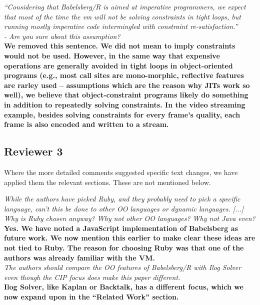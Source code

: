 \documentclass[english]{article}
\begin{document}
\textit{``Considering that Babelsberg/R is aimed at imperative
  programmers, we expect that most of the time the vm will not be
  solving constraints in tight loops, but running mostly imperative
  code intermingled with
  constraint re-satisfaction.''\\
  - Are you sure about this assumption?}\\
\textbf{We removed this sentence. We did not mean to imply constraints
  would not be used. However, in the same way that expensive
  operations are generally avoided in tight loops in object-oriented
  programs (e.g., most call sites are mono-morphic, reflective
  features are rarley used -- assumptions which are the reason why
  JITs work so well), we believe that object-constraint programs
  likely do something in addition to repeatedly solving
  constraints. In the video streaming example, besides solving
  constraints for every frame's quality, each frame is also encoded
  and written to a
  stream.}\\

\subsection*{Reviewer 3}

Where the more detailed comments suggested specific text changes, we
have applied them the relevant sections. These are not mentioned below.


\textit{While the authors have picked Ruby, and they probably need to
  pick a specific language, can't this be done to other OO languages
  or dynamic languages. [...] Why is Ruby chosen
  anyway? Why not other OO languages? Why not Java even?}\\
\textbf{Yes. We have noted a JavaScript implementation of
  Babelsberg as future work. We now mention this earlier to make
  clear these ideas are not tied to Ruby. The reason for choosing Ruby
  was that one of the authors was already familiar with the
  VM.}\\

\textit{The authors should compare the OO features of Babelsberg/R
  with Ilog Solver even though the CIP focus does make this paper
  different.}\\
\textbf{Ilog Solver, like Kaplan or Backtalk, has a different focus,
  which we now expand upon in the ``Related Work'' section.}\\
\end{document}
